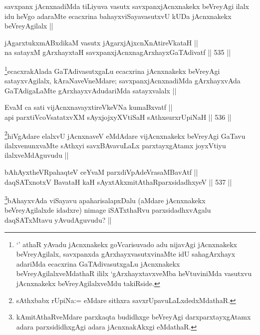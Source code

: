 \begin{artha}
savxpanx jAcnxnadiMda tiLiyuva vasutx savxpanxjAcnxnakekx beVreyAgi ilalx idu heVgo adaraMte ecacxrina bahayxviSayavasutxvU kUDa jAcnxnakekx beVreyAgilalx ||
\end{artha}


\begin{shl}
jAgarxtukxmABxdikaM vasutx jAgarxjAjxcnXnAtireVkataH || \\
na satayxM gArxhayxtaH savxpanxjAcnxnagArxhayxGaTAdivatf ||  535 ||  
\end{shl}

\begin{artha}
\footnote{`\stext' athaR yAvadu jAcnxnakekx goVcarisuvado adu nijavAgi jAcnxnakekx beVreyAgilalx, savxpanxda gArxhayxvasutxvinaMte idU sahagArxhayx adariMda ecacxrina GaTAdivasutxgaLu jAcnxnakekx beVreyAgilalxveMdathaR ililx `gArxhayxtavxveMba heVtuviniMda vasutxvu jAcnxnakekx beVreyAgilalxveMdu takiRside.}ecacxrakAlada GaTAdivasutxgaLu ecacxrina jAcnxnakekx beVreyAgi satayxvAgilalx, kAraNaveVneMdare; savxpanxjAcnxnadiMda gArxhayxvAda GaTAdigaLaMte gArxhayxvAdudariMda satayxvalalx ||
\end{artha}

\begin{shl}
EvaM ca sati vijAcnxnavayxtireVkeVNa kumaBxvatf || \\
api parxtiVcoV\s satatxvXM sAyxjojxyXVtiSaH sAthxsurxrUpiNaH ||  536 ||  
\end{shl}

\begin{artha}
\footnote{sAthxbabx rUpiNa:= eMdare sithxra savxrUpavuLaLxdedxMdathaR.}hiVgAdare elalxvU jAcnxnaveV eMdAdare vijAcnxnakekx beVreyAgi GaTavu ilalxvenunxvaMte sAthxyi savxBAvavuLaLx parxtayxgAtamx joyxVtiyu ilalxveMdAguvudu ||
\end{artha}

\begin{shl}
bAhAyxtheVR\s pahaqteV ceYvaM parxdiVpAdeVrasaMBavAtf ||  \\
daqSATxnotxV BavataH kaH sAyxtAkxmitAthaRparxsidadhxyeV ||  537 ||  
\end{shl}

\begin{artha}
\footnote{kAmitAthaRveMdare parxkaqta budidhxge beVreyAgi darxparxtayxgAtamx adara parxsididhxgAgi adara jAcnxnakAkxgi eMdathaR.}bAhayxvAda viSayavu apaharisalapxDalu (aMdare jAcnxnakekx beVreyAgilalxde idadxre) nimage iSATxthaRvu parxsidadhxvAgalu daqSATxMtavu yAvudAguvudu? ||
\end{artha}

